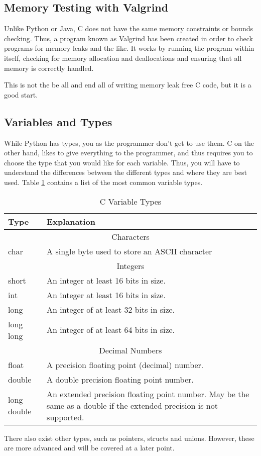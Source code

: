 		\subsection{Memory Testing with Valgrind}
			Unlike Python or Java, C does not have the same memory constraints or bounds checking. 
			Thus, a program known as Valgrind has been created in order to check programs for memory leaks and the like. 
			It works by running the program within itself, checking for memory allocation and deallocations and ensuring that all memory is correctly handled. 

			This is not the be all and end all of writing memory leak free C code, but it is a good start. 
		\subsection{Variables and Types}
			While Python has types, you as the programmer don't get to use them. 
			C on the other hand, likes to give everything to the programmer, and thus requires you to choose the type that you would like for each variable. 
			Thus, you will have to understand the differences between the different types and where they are best used. 
			Table \ref{tab:CVariableTypes} contains a list of the most common variable types. 
			\begin{table}[htb]
				\centering
				\begin{adjustbox}{max width=1\textwidth}
				\begin{tabular}{| l | p{8cm} |}
					\hline
					\textbf{Type} & \textbf{Explanation} \\ \hline \hline
					\multicolumn{2}{|c|}{Characters} \\ \hline
					char & A single byte used to store an ASCII character \\ \hline\hline
					\multicolumn{2}{|c|}{Integers} \\ \hline
					short & An integer at least 16 bits in size. \\ \hline
					int & An integer at least 16 bits in size. \\ \hline
					long & An integer of at least 32 bits in size. \\ \hline
					long long & An integer of at least 64 bits in size. \\ \hline\hline
					\multicolumn{2}{|c|}{Decimal Numbers} \\ \hline
					float & A precision floating point (decimal) number. \\ \hline
					double & A double precision floating point number. \\ \hline
					long double & An extended precision floating point number. 
					May be the same as a double if the extended precision is not supported. \\ \hline
				\end{tabular}
				\end{adjustbox}
				\caption{C Variable Types}
				\label{tab:CVariableTypes}
			\end{table}
			There also exist other types, such as pointers, structs and unions. 
			However, these are more advanced and will be covered at a later point. 

